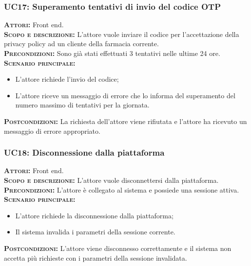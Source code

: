\subsubsection{UC17: Superamento tentativi di invio del codice OTP}
\label{sec:UC17}
\textsc{\textbf{Attori:}} Front end.\\
\textsc{\textbf{Scopo e descrizione:}} L'attore vuole inviare il codice per l'accettazione della privacy policy ad un cliente della farmacia corrente.\\
\textsc{\textsc{\textbf{Precondizioni:}}} Sono già stati effettuati 3 tentativi nelle ultime 24 ore.\\
\textsc{\textbf{Scenario principale:}}
\begin{itemize}
    \item L'attore richiede l'invio del codice;
    \item L'attore riceve un messaggio di errore che lo informa del superamento del numero massimo di tentativi per la giornata.
\end{itemize}
\textsc{\textbf{Postcondizioni:}} La richiesta dell'attore viene rifiutata e l'attore ha ricevuto un messaggio di errore appropriato.

\subsubsection{UC18: Disconnessione dalla piattaforma}
\label{sec:UC18}
\textsc{\textbf{Attori:}} Front end.\\
\textsc{\textbf{Scopo e descrizione:}} L'attore vuole disconnettersi dalla piattaforma.\\
\textsc{\textsc{\textbf{Precondizioni:}}} L'attore è collegato al sistema e possiede una sessione attiva.\\
\textsc{\textbf{Scenario principale:}}
\begin{itemize}
    \item L'attore richiede la disconnessione dalla piattaforma;
    \item Il sistema invalida i parametri della sessione corrente.
\end{itemize}
\textsc{\textbf{Postcondizioni:}} L'attore viene disconnesso correttamente e il sistema non accetta più richieste con i parametri della sessione invalidata.

